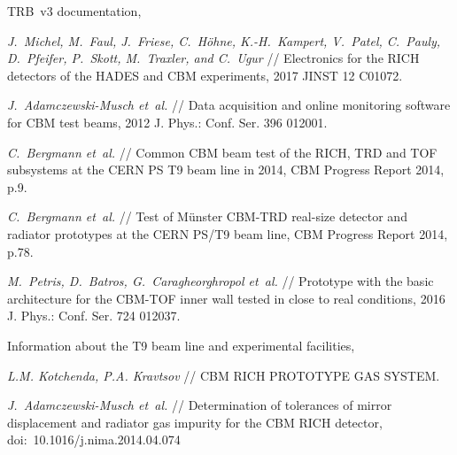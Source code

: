 \begin{thebibliography}{99}

TRB~v3 documentation,

\textit{J.~Michel, M.~Faul, J.~Friese, C.~H\"{o}hne, K.-H.~Kampert, V.~Patel, C.~Pauly, D.~Pfeifer, P.~Skott, M.~Traxler, and C.~Ugur} //
Electronics for the RICH detectors of the HADES and CBM experiments,
2017 JINST 12 C01072.

\textit{J.~Adamczewski-Musch et~al.} //
Data acquisition and online monitoring software for CBM test beams,
2012 J. Phys.: Conf. Ser. 396 012001.

\textit{C.~Bergmann et~al.} //
Common CBM beam test of the RICH, TRD and TOF subsystems at the CERN PS T9 beam line in 2014,
CBM Progress Report 2014, p.9.

\textit{C.~Bergmann et~al.} //
Test of M\"unster CBM-TRD real-size detector and radiator prototypes at the CERN PS/T9 beam line,
CBM Progress Report 2014, p.78.

\textit{M.~Petris, D.~Batros, G.~Caragheorghropol et~al.} //
Prototype with the basic architecture for the CBM-TOF inner wall tested in close to real conditions,
2016 J. Phys.: Conf. Ser. 724 012037.

Information about the T9 beam line and experimental facilities,

\textit{L.M. Kotchenda, P.A. Kravtsov} //
CBM RICH PROTOTYPE GAS SYSTEM.

\textit{J.~Adamczewski-Musch et~al.} //
Determination of tolerances of mirror displacement and radiator gas impurity for the CBM RICH detector,
doi:~10.1016/j.nima.2014.04.074


\end{thebibliography}
